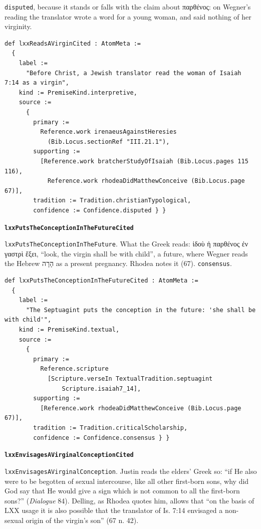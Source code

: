 \documentclass[11pt]{article}
\begin{document}
\texttt{disputed}, because it stands or falls with the claim about παρθένος: on Wegner’s reading the translator wrote a word for a young woman, and said nothing of her virginity.

{\small\begin{verbatim}
def lxxReadsAVirginCited : AtomMeta :=
  {
    label :=
      "Before Christ, a Jewish translator read the woman of Isaiah 7:14 as a virgin",
    kind := PremiseKind.interpretive,
    source :=
      {
        primary :=
          Reference.work irenaeusAgainstHeresies
            (Bib.Locus.sectionRef "III.21.1"),
        supporting :=
          [Reference.work bratcherStudyOfIsaiah (Bib.Locus.pages 115 116),
            Reference.work rhodeaDidMatthewConceive (Bib.Locus.page 67)],
        tradition := Tradition.christianTypological,
        confidence := Confidence.disputed } }
\end{verbatim}}
\par\medskip\noindent\textbf{\texttt{lxx\allowbreak{}Puts\allowbreak{}The\allowbreak{}Conception\allowbreak{}In\allowbreak{}The\allowbreak{}Future\allowbreak{}Cited}}\par\nobreak\noindent
\texttt{lxx\allowbreak{}Puts\allowbreak{}The\allowbreak{}Conception\allowbreak{}In\allowbreak{}The\allowbreak{}Future}. What the Greek reads: ἰδοὺ ἡ παρθένος ἐν γαστρὶ ἕξει, “look, the virgin shall be with child”, a future, where Wegner reads the Hebrew הָרָה as a present pregnancy. Rhodea notes it (67). \texttt{consensus}.

{\small\begin{verbatim}
def lxxPutsTheConceptionInTheFutureCited : AtomMeta :=
  {
    label :=
      "The Septuagint puts the conception in the future: 'she shall be with child'",
    kind := PremiseKind.textual,
    source :=
      {
        primary :=
          Reference.scripture
            [Scripture.verseIn TextualTradition.septuagint
                Scripture.isaiah7_14],
        supporting :=
          [Reference.work rhodeaDidMatthewConceive (Bib.Locus.page 67)],
        tradition := Tradition.criticalScholarship,
        confidence := Confidence.consensus } }
\end{verbatim}}
\par\medskip\noindent\textbf{\texttt{lxx\allowbreak{}Envisages\allowbreak{}AVirginal\allowbreak{}Conception\allowbreak{}Cited}}\par\nobreak\noindent
\texttt{lxx\allowbreak{}Envisages\allowbreak{}AVirginal\allowbreak{}Conception}. Justin reads the elders’ Greek so: “if He also were to be begotten of sexual intercourse, like all other first-born sons, why did God say that He would give a sign which is not common to all the first-born sons?” (\emph{Dialogue} 84). Delling, as Rhodea quotes him, allows that “on the basis of LXX usage it is also possible that the translator of Is. 7:14 envisaged a non-sexual origin of the virgin’s son” (67 n. 42).
\end{document}
